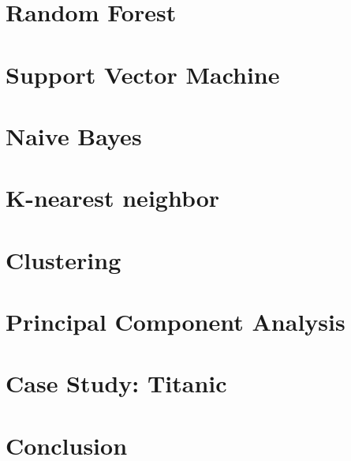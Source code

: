 \section[RandomForest]{Random Forest}




\section[SVM]{Support Vector Machine}



\section[NB]{Naive Bayes}




\section[Knn]{K-nearest neighbor}



\section[Clust]{Clustering}





\section[PCA]{Principal Component Analysis}



\section[Case]{Case Study: Titanic}




\section[End]{Conclusion}




